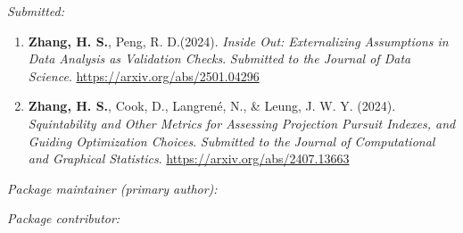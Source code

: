 \documentclass[10pt,a4paper]{article} %
\begin{document}

% 

\noindent\textit{Submitted:}\vspace{-0.5em}
\begin{enumerate}[resume]

    \item \textbf{Zhang, H. S.}, Peng, R. D.(2024). \textit{Inside Out: Externalizing Assumptions 
    in Data Analysis as Validation Checks}. \emph{Submitted to the Journal of Data Science}. 
    \url{https://arxiv.org/abs/2501.04296}
    
    \item \textbf{Zhang, H. S.}, Cook, D., Langren\'e, N., \& Leung, J. W. Y. (2024). \textit{Squintability and Other Metrics for Assessing Projection Pursuit Indexes, and Guiding Optimization Choices}. \emph{Submitted to the Journal of Computational and Graphical Statistics}. 
    \url{https://arxiv.org/abs/2407.13663}
\end{enumerate}


\noindent\textit{Package maintainer (primary author):}

\vspace{0.5em}

 \newline 
{} \newline
{} \newline 

\vspace{1em}
\noindent\textit{Package contributor:}
\end{document}
